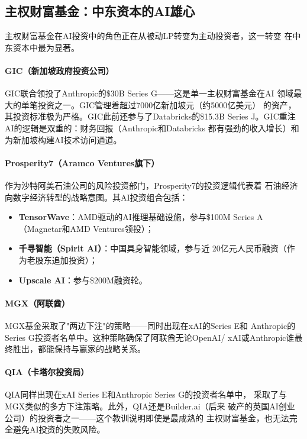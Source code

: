 \subsection{主权财富基金：中东资本的AI雄心}
\label{subsec:fund-sovereign}

主权财富基金在AI投资中的角色正在从被动LP转变为主动投资者，这一转变
在中东资本中最为显著。

\paragraph{GIC（新加坡政府投资公司）}

GIC联合领投了Anthropic的\$30B Series G——这是单一主权财富基金在AI
领域最大的单笔投资之一。GIC管理着超过7000亿新加坡元（约5000亿美元）
的资产，其投资标准极为严格。GIC此前还参与了Databricks的\$15.3B
Series J。GIC重注AI的逻辑是双重的：财务回报（Anthropic和Databricks
都有强劲的收入增长）和为新加坡构建AI技术访问通道。

\paragraph{Prosperity7（Aramco Ventures旗下）}

作为沙特阿美石油公司的风险投资部门，Prosperity7的投资逻辑代表着
石油经济向数字经济转型的战略意图。其AI投资组合包括：
\begin{itemize}
  \item \textbf{TensorWave}：AMD驱动的AI推理基础设施，参与\$100M
    Series A（Magnetar和AMD Ventures领投）；
  \item \textbf{千寻智能（Spirit AI）}：中国具身智能领域，参与近
    20亿元人民币融资（作为老股东追加投资）；
  \item \textbf{Upscale AI}：参与\$200M融资轮。
\end{itemize}

\paragraph{MGX（阿联酋）}

MGX基金采取了"两边下注"的策略——同时出现在xAI的Series E和
Anthropic的Series G投资者名单中。这种策略确保了阿联酋无论OpenAI/
xAI或Anthropic谁最终胜出，都能保持与赢家的战略关系。

\paragraph{QIA（卡塔尔投资局）}

QIA同样出现在xAI Series E和Anthropic Series G的投资者名单中，
采取了与MGX类似的多方下注策略。此外，QIA还是Builder.ai（后来
破产的英国AI创业公司）的投资者之一——这个教训说明即使是最成熟的
主权财富基金，也无法完全避免AI投资的失败风险。

